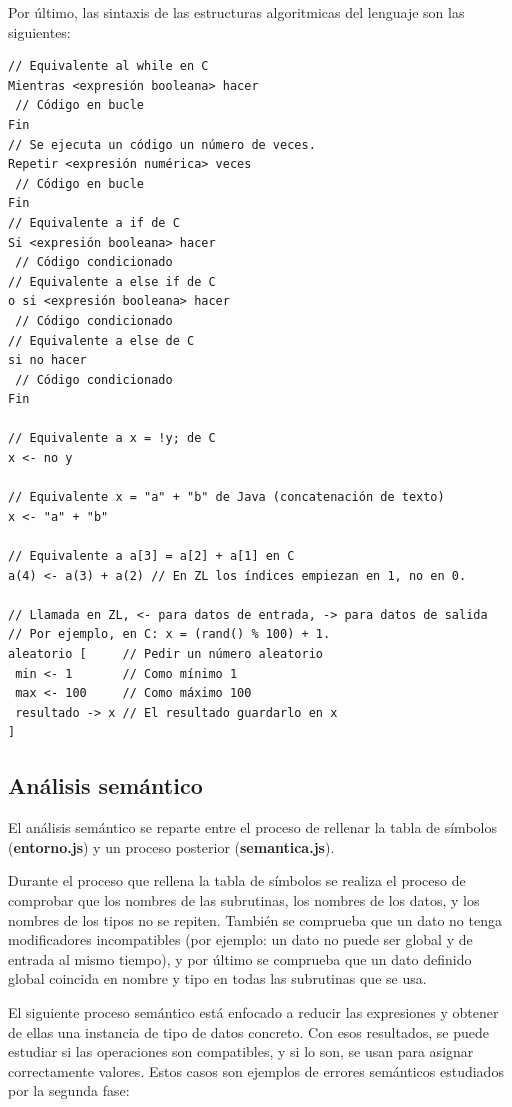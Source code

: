 \documentclass{report}
\begin{document}
	\vspace{10px}
	
	Por último, las sintaxis de las estructuras algoritmicas del lenguaje son las siguientes:
	
	\begin{BVerbatim}
// Equivalente al while en C
Mientras <expresión booleana> hacer
 // Código en bucle
Fin
// Se ejecuta un código un número de veces. 
Repetir <expresión numérica> veces
 // Código en bucle
Fin
// Equivalente a if de C
Si <expresión booleana> hacer
 // Código condicionado
// Equivalente a else if de C
o si <expresión booleana> hacer
 // Código condicionado
// Equivalente a else de C
si no hacer
 // Código condicionado
Fin

// Equivalente a x = !y; de C
x <- no y

// Equivalente x = "a" + "b" de Java (concatenación de texto)
x <- "a" + "b"

// Equivalente a a[3] = a[2] + a[1] en C
a(4) <- a(3) + a(2) // En ZL los índices empiezan en 1, no en 0.

// Llamada en ZL, <- para datos de entrada, -> para datos de salida
// Por ejemplo, en C: x = (rand() % 100) + 1.
aleatorio [     // Pedir un número aleatorio
 min <- 1       // Como mínimo 1
 max <- 100     // Como máximo 100
 resultado -> x // El resultado guardarlo en x
]
	\end{BVerbatim}
	
	\subsection{Análisis semántico}
	
	El análisis semántico se reparte entre el proceso de rellenar la tabla de símbolos (\textbf{entorno.js}) y un proceso posterior (\textbf{semantica.js}). 
	
	\vspace{10px}
	
	Durante el proceso que rellena la tabla de símbolos se realiza el proceso de comprobar que los nombres de las subrutinas, los nombres de los datos, y los nombres de los tipos no se repiten. También se comprueba que un dato no tenga modificadores incompatibles (por ejemplo: un dato no puede ser global y de entrada al mismo tiempo), y por último se comprueba que un dato definido global coincida en nombre y tipo en todas las subrutinas que se usa.
	
	\vspace{10px}
	
	El siguiente proceso semántico está enfocado a reducir las expresiones y obtener de ellas una instancia de tipo de datos concreto. Con esos resultados, se puede estudiar si las operaciones son compatibles, y si lo son, se usan para asignar correctamente valores. Estos casos son ejemplos de errores semánticos estudiados por la segunda fase:
	
\end{document}
